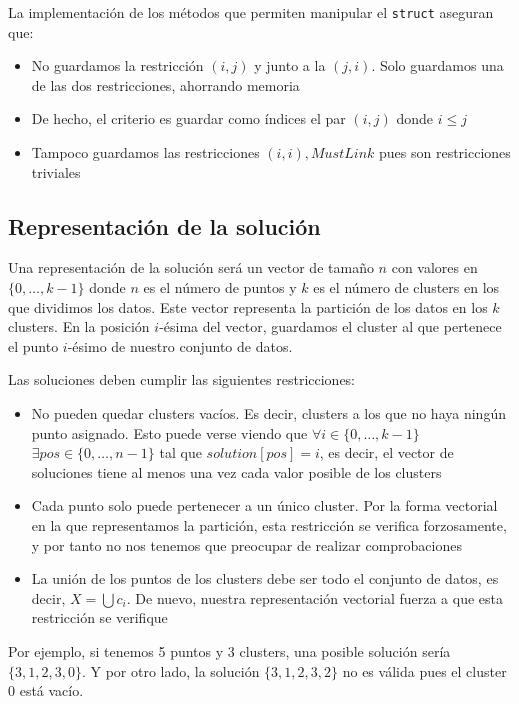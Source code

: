 \documentclass[11pt]{article}
\begin{document}
La implementación de los métodos que permiten manipular el \lstinline{struct} aseguran que:
\begin{itemize}
\item No guardamos la restricción $(i, j)$ y junto a la $(j, i)$. Solo guardamos una de las dos restricciones, ahorrando memoria
\item De hecho, el criterio es guardar como índices el par $(i, j)$ donde $i \leq j$
\item Tampoco guardamos las restricciones $(i, i), MustLink$ pues son restricciones triviales
\end{itemize}


\subsection{Representación de la solución}

Una representación de la solución será un vector de tamaño $n$ con valores en $\{0, \ldots, k - 1\}$ donde $n$ es el número de puntos y $k$ es el número de clusters en los que dividimos los datos. Este vector representa la partición de los datos en los $k$ clusters. En la posición $i$-ésima del vector, guardamos el cluster al que pertenece el punto $i$-ésimo de nuestro conjunto de datos.

Las soluciones deben cumplir las siguientes restricciones:

\begin{itemize}
\item No pueden quedar clusters vacíos. Es decir, clusters a los que no haya ningún punto asignado. Esto puede verse viendo que $\forall i \in \{0, \ldots, k-1\}$ $\exists pos \in \{0, \ldots, n-1\}$ tal que $solution[pos] = i$, es decir, el vector de soluciones tiene al menos una vez cada valor posible de los clusters
\item Cada punto solo puede pertenecer a un único cluster. Por la forma vectorial en la que representamos la partición, esta restricción se verifica forzosamente, y por tanto no nos tenemos que preocupar de realizar comprobaciones
\item La unión de los puntos de los clusters debe ser todo el conjunto de datos, es decir, $X = \bigcup c_i$. De nuevo, nuestra representación vectorial fuerza a que esta restricción se verifique
\end{itemize}

Por ejemplo, si tenemos 5 puntos y 3 clusters, una posible solución sería $\{3, 1, 2, 3, 0\}$. Y por otro lado, la solución $\{3, 1, 2, 3, 2\}$ no es válida pues el cluster $0$ está vacío.
\end{document}
